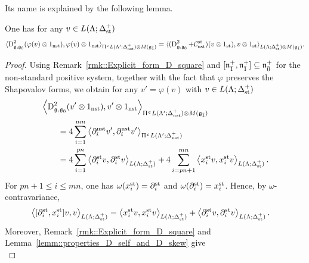 Its name is explained by the following lemma. 

\begin{lemma} \label{lemm::corrected_Dirac_action}
 One has for any $v \in L(\Lambda;\Delta_{{\text{st}}}^{+})$
 \[
 \langle \operatorname{D}_{{\mathfrak{g}},{\mathfrak{g}_{\bar{0}}}}^{2}(\varphi(v)\otimes 1_{{\text{nst}}}),\varphi(v)\otimes 1_{{\text{nst}}}\rangle_{ \Uppi^{\upepsilon}L(\Lambda';\Delta_{{\text{nst}}}^{+})\otimes M({\mathfrak{g}_{\bar{1}}})}=\langle (\operatorname{D}_{{\mathfrak{g}},{\mathfrak{g}_{\bar{0}}}}^{2}+\mathcal{C}_{{\text{nst}}}^{{\text{st}}})(v\otimes 1_{{\text{st}}}),v\otimes 1_{{\text{st}}}\rangle_{L(\Lambda;\Delta_{{\text{st}}}^{+})\otimes M({\mathfrak{g}_{\bar{1}}})}.\]
\end{lemma}

\begin{proof}
Using Remark~\ref{rmk::Explicit_form_D_square} and
$[{\mathfrak{n}}_{\bar1}^{+},{\mathfrak{n}}_{\bar1}^{+}]\subseteq{\mathfrak{n}}_{\bar0}^{+}$ for the
non-standard positive system, together with the fact that $\varphi$
preserves the Shapovalov forms, we obtain for any $v'=\varphi(v)$ with $v \in L(\Lambda;\Delta_{{\text{st}}}^{+})$
\begin{equation*}
\begin{aligned}
&
\left\langle
\operatorname{D}_{{\mathfrak{g}},{\mathfrak{g}_{\bar{0}}}}^{2}(v'\otimes1_{{\text{nst}}}),
v'\otimes1_{{\text{nst}}}
\right\rangle_
{ \Uppi^{\upepsilon}L(\Lambda';\Delta_{{\text{nst}}}^{+})\otimes M({\mathfrak{g}_{\bar{1}}})}
\\
&\qquad=
4\sum_{i=1}^{mn}
\left\langle
\partial_i^{{\text{nst}}}v',
\partial_i^{{\text{nst}}}v'
\right\rangle_
{ \Uppi^{\upepsilon}L(\Lambda';\Delta_{{\text{nst}}}^{+})}
\\
&\qquad=
4\sum_{i=1}^{pn}
\left\langle
\partial_i^{{\text{st}}}v,\partial_i^{{\text{st}}}v
\right\rangle_
{L(\Lambda;\Delta_{{\text{st}}}^{+})}
+
4\sum_{i=pn+1}^{mn}
\left\langle
x_i^{{\text{st}}}v,x_i^{{\text{st}}}v
\right\rangle_
{L(\Lambda;\Delta_{{\text{st}}}^{+})}.
\end{aligned}
\end{equation*}
For $pn+1\leq i\leq mn$, one has
$\omega(x_i^{{\text{st}}})=\partial_i^{{\text{st}}}$ and
$\omega(\partial_i^{{\text{st}}})=x_i^{{\text{st}}}$. Hence, by
$\omega$-contravariance,
\begin{equation*}
\begin{aligned}
\left\langle
[\partial_i^{{\text{st}}},x_i^{{\text{st}}}]v,v
\right\rangle_
{L(\Lambda;\Delta_{{\text{st}}}^{+})}
&=
\left\langle
x_i^{{\text{st}}}v,x_i^{{\text{st}}}v
\right\rangle_
{L(\Lambda;\Delta_{{\text{st}}}^{+})}
+
\left\langle
\partial_i^{{\text{st}}}v,\partial_i^{{\text{st}}}v
\right\rangle_
{L(\Lambda;\Delta_{{\text{st}}}^{+})}.
\end{aligned}
\end{equation*}
Moreover, Remark~\ref{rmk::Explicit_form_D_square} and
Lemma~\ref{lemm::properties_D_self_and_D_skew} give
\begin{equation*}

\end{equation*}
\end{proof}
